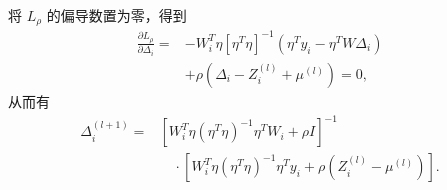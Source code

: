 将 $L_\rho$ 的偏导数置为零，得到
\begin{equation}
\begin{aligned}
\frac{\partial L_\rho}{\partial\Delta_i}
={}&-W_i^T\eta[\eta^T\eta]^{-1}
\left(\eta^Ty_i-\eta^TW\Delta_i\right)\\
&+\rho\left(\Delta_i-Z_i^{(l)}+\mu^{(l)}\right)=0,
\end{aligned}
\tag{1.118}
\end{equation}
从而有
\begin{equation}
\begin{aligned}
\Delta_i^{(l+1)}
={}&\left[W_i^T\eta(\eta^T\eta)^{-1}\eta^TW_i+\rho I\right]^{-1}\\
&\quad\cdot
\left[W_i^T\eta(\eta^T\eta)^{-1}\eta^Ty_i
 +\rho\left(Z_i^{(l)}-\mu^{(l)}\right)\right].
\end{aligned}
\tag{1.119}
\end{equation}

